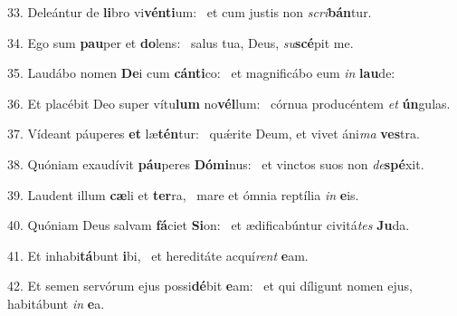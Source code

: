 33. Deleántur de \textbf{li}bro vi\textbf{vén}\textbf{ti}um: \ast\  et cum justis non \textit{scri}\textbf{bán}tur.\

34. Ego sum \textbf{pau}per et \textbf{do}lens: \ast\  salus tua, Deus, \textit{su}\textbf{scé}pit me.\

35. Laudábo nomen \textbf{De}i cum \textbf{cán}\textbf{ti}co: \ast\  et magnificábo eum \textit{in} \textbf{lau}de:\

36. Et placébit Deo super vítu\textbf{lum} no\textbf{vél}lum: \ast\  córnua producéntem \textit{et} \textbf{ún}gulas.\

37. Vídeant páuperes \textbf{et} læ\textbf{tén}tur: \ast\  quǽrite Deum, et vivet áni\textit{ma} \textbf{ves}tra.\

38. Quóniam exaudívit \textbf{páu}peres \textbf{Dó}\textbf{mi}nus: \ast\  et vinctos suos non \textit{de}\textbf{spé}xit.\

39. Laudent illum \textbf{cæ}li et \textbf{ter}ra, \ast\  mare et ómnia reptília \textit{in} \textbf{e}is.\

40. Quóniam Deus salvam \textbf{fá}ciet \textbf{Si}on: \ast\  et ædificabúntur civitá\textit{tes} \textbf{Ju}da.\

41. Et inhabi\textbf{tá}bunt \textbf{i}bi, \ast\  et hereditáte acquí\textit{rent} \textbf{e}am.\

42. Et semen servórum ejus possi\textbf{dé}bit \textbf{e}am: \ast\  et qui díligunt nomen ejus, habitábunt \textit{in} \textbf{e}a.\

